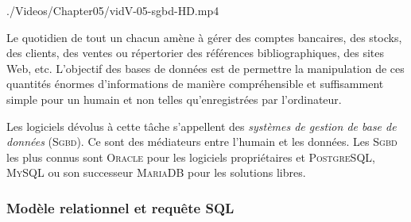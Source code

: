 \begin{marginvideo}%
		{./Videos/Chapter05/vidV-05-sgbd-HD.mp4}%
\end{marginvideo}

Le quotidien de tout un chacun amène à gérer des comptes bancaires, des stocks, des clients, des ventes ou répertorier des références bibliographiques, des sites Web, etc. L'objectif des bases de données est de permettre la manipulation de ces quantités énormes d'informations de manière compréhensible et suffisamment simple pour un humain et non telles qu'enregistrées par l'ordinateur.

Les logiciels dévolus à cette tâche s'appellent des \emph{systèmes de gestion de base de données} (\textsc{Sgbd}). Ce sont des médiateurs entre l'humain et les données. Les \textsc{Sgbd} les plus connus sont \textsc{Oracle} pour les logiciels propriétaires et \textsc{PostgreSQL}, \textsc{MySQL} ou son successeur \textsc{MariaDB} pour les solutions libres.



\subsubsection[Modèle relationnel et requête SQL]{Modèle relationnel et requête SQL}
\label{subsub:V.3.3.1}

